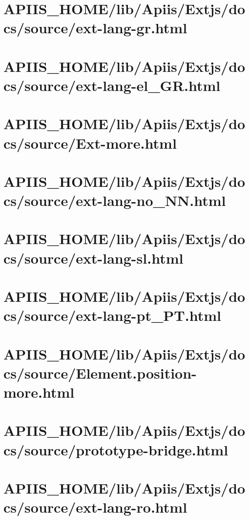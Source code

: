 \section{APIIS\_HOME/lib/Apiis/Extjs/docs/source/ext-lang-gr.html} 
\section{APIIS\_HOME/lib/Apiis/Extjs/docs/source/ext-lang-el\_GR.html} 
\section{APIIS\_HOME/lib/Apiis/Extjs/docs/source/Ext-more.html} 
\section{APIIS\_HOME/lib/Apiis/Extjs/docs/source/ext-lang-no\_NN.html} 
\section{APIIS\_HOME/lib/Apiis/Extjs/docs/source/ext-lang-sl.html} 
\section{APIIS\_HOME/lib/Apiis/Extjs/docs/source/ext-lang-pt\_PT.html} 
\section{APIIS\_HOME/lib/Apiis/Extjs/docs/source/Element.position-more.html} 
\section{APIIS\_HOME/lib/Apiis/Extjs/docs/source/prototype-bridge.html} 
\section{APIIS\_HOME/lib/Apiis/Extjs/docs/source/ext-lang-ro.html} 
